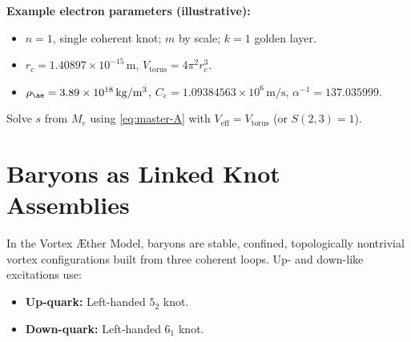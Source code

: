 \documentclass[12pt]{article}
\begin{document}
  \noindent
  \textbf{Example electron parameters (illustrative):}
  \begin{itemize}
      \item \(n=1\), single coherent knot; \(m\) by scale; \(k=1\) golden layer.
      \item \(r_c = 1.40897\times 10^{-15}\,\mathrm{m}\), \(V_{\text{torus}}=4\pi^2 r_c^3\).
      \item \(\rho_{\ae}=3.89\times10^{18}\,\mathrm{kg/m^3}\), \(C_e=1.09384563\times10^6\,\mathrm{m/s}\), \(\alpha^{-1}=137.035999\).
  \end{itemize}
  Solve \(s\) from \(M_e\) using \eqref{eq:master-A} with \(V_{\text{eff}}=V_{\text{torus}}\) (or \(S(2,3)=1\)).

  \section{Baryons as Linked Knot Assemblies}
  In the Vortex \AE ther Model, baryons are stable, confined, topologically nontrivial vortex configurations built from three coherent loops. Up- and down-like excitations use:
  \begin{itemize}
      \item \textbf{Up-quark:} Left-handed \(5_2\) knot.
      \item \textbf{Down-quark:} Left-handed \(6_1\) knot.
  \end{itemize}
\end{document}
